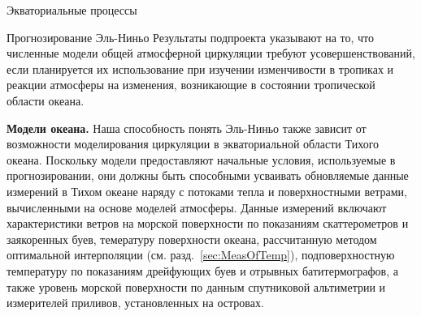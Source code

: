 \begin{chapter}{Экваториальные процессы}
\begin{section}{Прогнозирование Эль-Ниньо}
Результаты подпроекта указывают на то, что численные модели общей атмосферной
циркуляции требуют усовершенствований, если планируется их использование
при изучении изменчивости в тропиках и реакции атмосферы на изменения,
возникающие в состоянии тропической области океана.
%

\textbf{Модели океана.} Наша способность понять Эль-Ниньо%
%
%
 также зависит от возможности моделирования
циркуляции в экваториальной области Тихого океана. Поскольку модели 
предоставляют начальные условия, используемые в прогнозировании, они должны
быть способными усваивать обновляемые данные измерений в Тихом океане
наряду с потоками тепла и поверхностными ветрами,
вычисленными на основе моделей атмосферы. Данные измерений включают
характеристики ветров на морской поверхности по показаниям скаттерометров%
и заякоренных буев, темературу поверхности океана, рассчитанную методом
оптимальной интерполяции (см. разд.~\ref{sec:MeasOfTemp}), подповерхностную
температуру по показаниям дрейфующих буев и отрывных батитермографов,
а также уровень морской поверхности по данным спутниковой альтиметрии
и измерителей приливов, установленных на островах.
%


\end{section}
\end{chapter}
